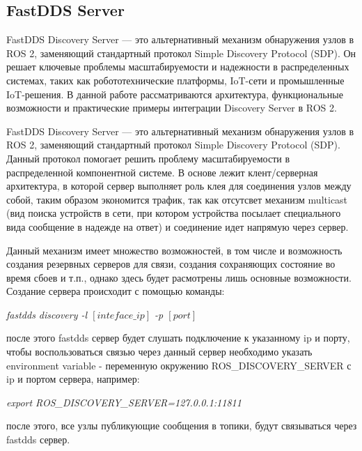 \documentclass[a4paper, 14pt]{extreport}
\begin{document}
\subsection{FastDDS Server}FastDDS Discovery Server — это альтернативный механизм обнаружения узлов в ROS 2, заменяющий стандартный протокол
 Simple Discovery Protocol (SDP)\cite{sdpOverview}. Он решает ключевые проблемы масштабируемости и надежности в распределенных системах, таких
 как робототехнические платформы, IoT-сети и промышленные IoT-решения. В данной работе рассматриваются архитектура, функциональные возможности
 и практические примеры интеграции Discovery Server в ROS 2.
\par FastDDS Discovery Server — это альтернативный механизм обнаружения узлов в ROS 2, заменяющий стандартный протокол Simple
Discovery Protocol (SDP). Данный протокол помогает решить проблему масштабируемости в распределенной компонентной системе. В основе
лежит клент/серверная архитектура, в которой сервер выполняет роль клея для соединения узлов между собой, таким образом экономится
трафик, так как отсутсвет механизм multicast (вид поиска устройств в сети, при котором устройства посылает специального вида сообщение 
в надежде на ответ) и соединение идет напрямую через сервер.
\par\noindent Данный механизм имеет множество возможностей, в том числе и возможность создания резервных серверов для связи, создания
сохраняющих состояние во время сбоев и т.п., однако здесь будет расмотрены лишь основные возможности. Создание сервера происходит с 
помощью команды:
\begin{center}
        \par \textsl{fastdds discovery -l $\left[inteface\_ip\right]$ -p $\left[port\right]$}
\end{center}
\par\noindent после этого fastdds сервер будет слушать подключение к указанному ip и порту, чтобы воспользоваться связью через данный сервер
необходимо указать environment variable - переменную окружению ROS\_DISCOVERY\_SERVER с ip и портом сервера, например:
\begin{center}
        \par \textsl{export ROS\_DISCOVERY\_SERVER=127.0.0.1:11811}
\end{center}
\par\noindent после этого, все узлы публикующие сообщения в топики, будут связываться через fastdds сервер.
\end{document}
